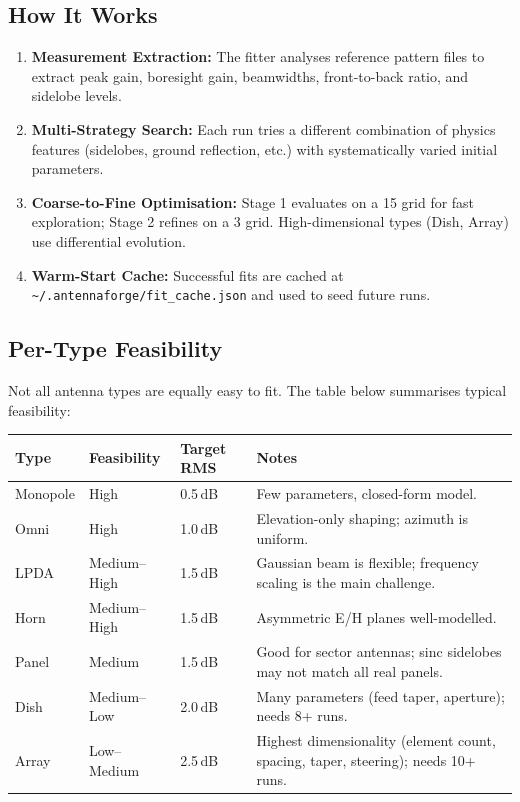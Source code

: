 \documentclass[11pt,a4paper]{article}
\begin{document}
\subsection{How It Works}
\begin{enumerate}
    \item \textbf{Measurement Extraction:} The fitter analyses reference pattern files to extract peak gain, boresight gain, beamwidths, front-to-back ratio, and sidelobe levels.
    \item \textbf{Multi-Strategy Search:} Each run tries a different combination of physics features (sidelobes, ground reflection, etc.) with systematically varied initial parameters.
    \item \textbf{Coarse-to-Fine Optimisation:} Stage 1 evaluates on a 15\textdegree{} grid for fast exploration; Stage 2 refines on a 3\textdegree{} grid. High-dimensional types (Dish, Array) use differential evolution.
    \item \textbf{Warm-Start Cache:} Successful fits are cached at \texttt{\~{}/.antennaforge/fit\_cache.json} and used to seed future runs.
\end{enumerate}

\subsection{Per-Type Feasibility}
Not all antenna types are equally easy to fit. The table below summarises typical feasibility:

\begin{longtable}{p{3cm} p{2.5cm} p{3cm} p{5cm}}
\toprule
\textbf{Type} & \textbf{Feasibility} & \textbf{Target RMS} & \textbf{Notes} \\
\midrule
Monopole & High & 0.5\,dB & Few parameters, closed-form model. \\
Omni & High & 1.0\,dB & Elevation-only shaping; azimuth is uniform. \\
LPDA & Medium--High & 1.5\,dB & Gaussian beam is flexible; frequency scaling is the main challenge. \\
Horn & Medium--High & 1.5\,dB & Asymmetric E/H planes well-modelled. \\
Panel & Medium & 1.5\,dB & Good for sector antennas; sinc sidelobes may not match all real panels. \\
Dish & Medium--Low & 2.0\,dB & Many parameters (feed taper, aperture); needs 8+ runs. \\
Array & Low--Medium & 2.5\,dB & Highest dimensionality (element count, spacing, taper, steering); needs 10+ runs. \\
\bottomrule
\end{longtable}
\end{document}
